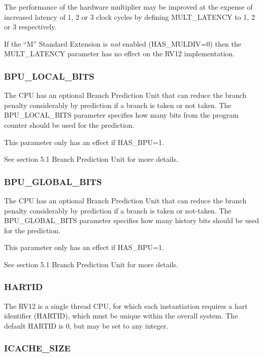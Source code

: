 The performance of the hardware multiplier may be improved at the
expense of increased latency of 1, 2 or 3 clock cycles by defining
MULT\_LATENCY to 1, 2 or 3 respectively.

If the ``M'' Standard Extension is \emph{not} enabled (HAS\_MULDIV=0)
then the MULT\_LATENCY parameter has no effect on the RV12
implementation.

\subsubsection{BPU\_LOCAL\_BITS}\label{bpu_local_bits}

The CPU has an optional Branch Prediction Unit that can reduce the
branch penalty considerably by prediction if a branch is taken or not
taken. The BPU\_LOCAL\_BITS parameter specifies how many bits from the
program counter should be used for the prediction.

This parameter only has an effect if HAS\_BPU=1.

\protect\hypertarget{_Toc326677733}{}{\protect\hypertarget{_Toc327108319}{}{}}See
section 5.1 Branch Prediction Unit for more details.

\subsubsection{BPU\_GLOBAL\_BITS}\label{bpu_global_bits}

The CPU has an optional Branch Prediction Unit that can reduce the
branch penalty considerably by prediction if a branch is taken or
not-taken. The BPU\_GLOBAL\_BITS parameter specifies how many history
bits should be used for the prediction.

This parameter only has an effect if HAS\_BPU=1.

\protect\hypertarget{_Toc326677734}{}{\protect\hypertarget{_Toc327108320}{}{}}See
section 5.1 Branch Prediction Unit for more details.

\subsubsection{HARTID}\label{hartid}

The RV12 is a single thread CPU, for which each instantiation requires a
hart identifier (HARTID), which must be unique within the overall
system. The default HARTID is 0, but may be set to any integer.

\subsubsection{ICACHE\_SIZE}\label{icache_size}

